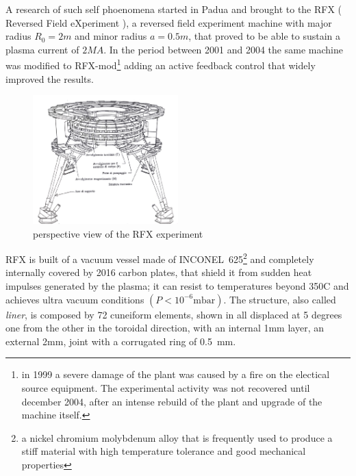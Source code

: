 A research of such self phoenomena started in Padua and brought to the RFX ( Reversed Field eXperiment ), a reversed field experiment machine with major radius $R_0 = 2m$ and minor radius $a = 0.5m$, that proved to be able to sustain a plasma current of $2MA$. In the period between 2001 and 2004 the same machine was modified to RFX-mod\footnote{in 1999 a severe damage of the plant was caused by a fire on the electical source equipment. The experimental activity was not recovered until december 2004, after an intense rebuild of the plant and upgrade of the machine itself.} adding an active feedback control that widely improved the results.
\begin{figure}[ht!]
\centering
\includegraphics[width=0.5\textwidth]{img/rfx2}
\caption{ perspective view of the RFX experiment }
\label{img:rfx}
\end{figure}
%
RFX is built of a vacuum vessel made of INCONEL~625\footnote{a nickel chromium molybdenum alloy that is frequently used to produce a stiff material with high temperature tolerance and good mechanical properties} and completely internally covered by 2016 carbon plates, that shield it from sudden heat impulses generated by the plasma; it can resist to temperatures beyond 350C and achieves ultra vacuum conditions $(P < 10^{-6} \text{mbar})$.
The structure, also called \textit{liner}, is composed by 72 cuneiform elements, shown in \Figure{\ref{fig:rfx_liner}} all displaced at 5 degrees one from the other in the toroidal direction, with an internal 1mm layer, an external 2mm, joint with a corrugated ring of 0.5~mm.
